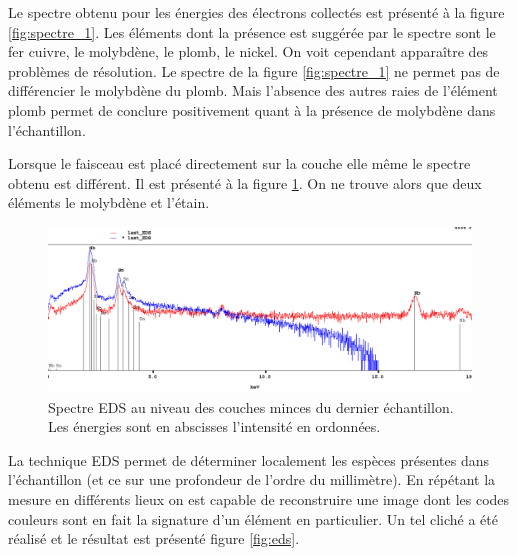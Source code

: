 \documentclass[a4paper,12pt]{article}
\begin{document}
Le spectre obtenu pour les énergies des électrons collectés est présenté à la figure \ref{fig:spectre_1}.
Les éléments dont la présence est suggérée par le spectre sont le fer cuivre, le molybdène, le plomb, le nickel.
On voit cependant apparaître des problèmes de résolution. Le spectre de la figure \ref{fig:spectre_1}
ne permet pas de différencier le molybdène du plomb. Mais l'absence des autres raies de l'élément plomb
permet de conclure positivement quant à la présence de molybdène dans l'échantillon.

Lorsque le faisceau est placé directement sur la couche elle même le spectre obtenu est différent.
Il est présenté à la figure \ref{fig:spectre_2}. On ne trouve alors que deux éléments le molybdène et
l'étain.






\begin{figure}
\centering
\includegraphics[width=\textwidth]{images/im4.png}
\caption{Spectre EDS au niveau des couches minces du dernier échantillon. Les énergies sont en abscisses l'intensité en ordonnées.}
\label{fig:spectre_2}
\end{figure}

La technique EDS permet de déterminer localement les espèces présentes dans l'échantillon (et ce sur une profondeur
de l'ordre du millimètre). En répétant la mesure en différents lieux on est capable de reconstruire une image
dont les codes couleurs sont en fait la signature d'un élément en particulier. Un tel cliché a été réalisé et le
résultat est présenté figure \ref{fig:eds}.
\end{document}

